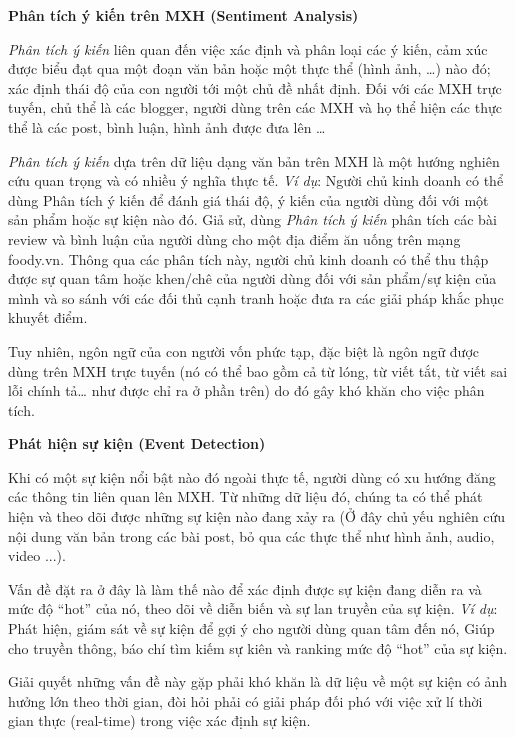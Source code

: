 \documentclass[12pt]{extarticle}
\begin{document}
			\par \textbf{Phân tích ý kiến trên MXH (Sentiment Analysis)}
			\par \textit{Phân tích ý kiến} liên quan đến việc xác định và phân loại các ý kiến, cảm xúc được biểu đạt qua một đoạn văn bản hoặc một thực thể (hình ảnh, …) nào đó; xác định thái độ của con người tới một chủ đề nhất định. Đối với các MXH trực tuyến, chủ thể là các blogger, người dùng trên các MXH và họ thể hiện các thực thể là các post, bình luận, hình ảnh được đưa lên …
			\par \textit{Phân tích ý kiến} dựa trên dữ liệu dạng văn bản trên MXH là một hướng nghiên cứu quan trọng và có nhiều ý nghĩa thực tế. \textit{Ví dụ}: Người chủ kinh doanh có thể dùng Phân tích ý kiến để đánh giá thái độ, ý kiến của người dùng đối với một sản phẩm hoặc sự kiện nào đó. Giả sử, dùng \textit{Phân tích ý kiến} phân tích các bài review và bình luận của người dùng cho một địa điểm ăn uống trên mạng foody.vn. Thông qua các phân tích này, người chủ kinh doanh có thể thu thập được sự quan tâm hoặc khen/chê của người dùng đối với sản phẩm/sự kiện của mình và so sánh với các đối thủ cạnh tranh hoặc đưa ra các giải pháp khắc phục khuyết điểm.
			\par Tuy nhiên, ngôn ngữ của con người vốn phức tạp, đặc biệt là ngôn ngữ được dùng trên MXH trực tuyến (nó có thể bao gồm cả từ lóng, từ viết tắt, từ viết sai lỗi chính tả… như được chỉ ra ở phần trên) do đó gây khó khăn cho việc phân tích.
			\par \textbf{Phát hiện sự kiện (Event Detection)}
			\par Khi có một sự kiện nổi bật nào đó ngoài thực tế, người dùng có xu hướng đăng các thông tin liên quan lên MXH. Từ những dữ liệu đó, chúng ta có thể phát hiện và theo dõi được những sự kiện nào đang xảy ra (Ở đây chủ yếu nghiên cứu nội dung văn bản trong các bài post, bỏ qua các thực thể như hình ảnh, audio, video ...).
			\par Vấn đề đặt ra ở đây là làm thế nào để xác định được sự kiện đang diễn ra và mức độ “hot” của nó, theo dõi về diễn biến và sự lan truyền của sự kiện. \textit{Ví dụ}: Phát hiện, giám sát về sự kiện để gợi ý cho người dùng quan tâm đến nó, Giúp cho truyền thông, báo chí tìm kiếm sự kiên và ranking mức độ “hot” của sự kiện.
			\par Giải quyết những vấn đề này gặp phải khó khăn là dữ liệu về một sự kiện có ảnh hưởng lớn theo thời gian, đòi hỏi phải có giải pháp đối phó với việc xử lí thời gian thực (real-time) trong việc xác định sự kiện.
	
\end{document}
